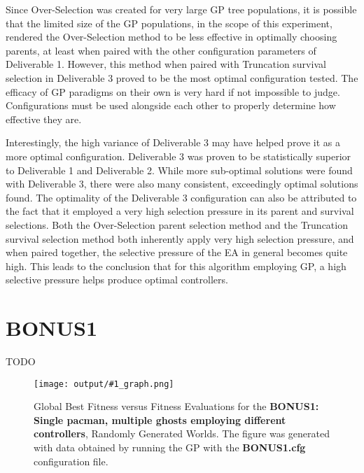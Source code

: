 \documentclass[11pt]{article}
\newcommand{\fitnessplotcaption}[2]{\caption{Global Best Fitness versus Fitness Evaluations for the \textbf{{#1}}, Randomly Generated Worlds. The figure was generated with data obtained by running the GP with the \textbf{{#2}} configuration file.}}
\newcommand{\addgraphic}[1]{\centerline{\texttt{[image: output/\#1\_graph.png]}}}
\begin{document}
Since Over-Selection was created for very large GP tree populations, it is possible that the limited size
of the GP populations, in the scope of this experiment, rendered the Over-Selection method to 
be less effective in optimally choosing parents, at least when paired with the
other configuration parameters of Deliverable 1. However, this method when paired with Truncation survival
selection in Deliverable 3 proved to be the most optimal configuration tested. The efficacy of GP paradigms 
on their own is very hard if not impossible to judge. Configurations must be used alongside each other to properly 
determine how effective they are.

Interestingly, the high variance of Deliverable 3 may have helped prove it as a more optimal configuration. Deliverable 3 was 
proven to be statistically superior to Deliverable 1 and Deliverable 2. While more sub-optimal solutions were found with Deliverable 3,
there were also many consistent, exceedingly optimal solutions found. The optimality of the Deliverable 3 
configuration can also be attributed to the fact that it employed a very high selection pressure in its parent and survival selections. Both
the Over-Selection parent selection method and the Truncation survival selection method both inherently apply very high selection
pressure, and when paired together, the selective pressure of the EA in general becomes quite high. This leads to the conclusion
that for this algorithm employing GP, a high selective pressure helps produce optimal controllers.


\section{BONUS1}
TODO

\begin{figure}[H]
    \addgraphic{BONUS1}
    \fitnessplotcaption{BONUS1: Single pacman, multiple ghosts employing different controllers}{BONUS1.cfg}
    \label{fig:BONUS1}
\end{figure}
\end{document}
